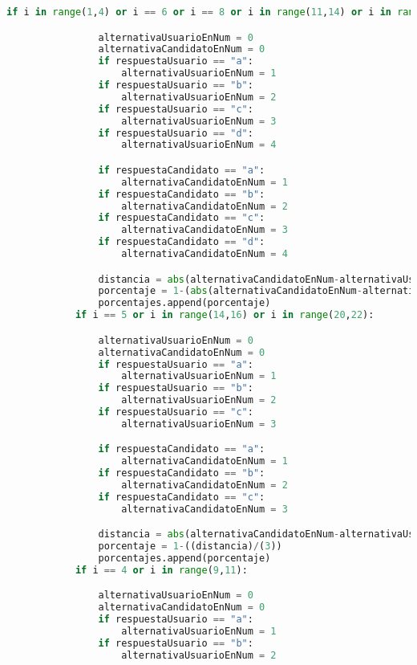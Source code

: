 \documentclass[a4paper]{article}
\begin{document}
\begin{lstlisting}[language=Python]
            if i in range(1,4) or i == 6 or i == 8 or i in range(11,14) or i in range(16,18) or i == 22: 

                alternativaUsuarioEnNum = 0
                alternativaCandidatoEnNum = 0
                if respuestaUsuario == "a":
                    alternativaUsuarioEnNum = 1
                if respuestaUsuario == "b":
                    alternativaUsuarioEnNum = 2
                if respuestaUsuario == "c":
                    alternativaUsuarioEnNum = 3
                if respuestaUsuario == "d":
                    alternativaUsuarioEnNum = 4

                if respuestaCandidato == "a":
                    alternativaCandidatoEnNum = 1
                if respuestaCandidato == "b":
                    alternativaCandidatoEnNum = 2
                if respuestaCandidato == "c":
                    alternativaCandidatoEnNum = 3
                if respuestaCandidato == "d":
                    alternativaCandidatoEnNum = 4

                distancia = abs(alternativaCandidatoEnNum-alternativaUsuarioEnNum)
                porcentaje = 1-(abs(alternativaCandidatoEnNum-alternativaUsuarioEnNum))/(4)
                porcentajes.append(porcentaje)
            if i == 5 or i in range(14,16) or i in range(20,22):

                alternativaUsuarioEnNum = 0
                alternativaCandidatoEnNum = 0
                if respuestaUsuario == "a":
                    alternativaUsuarioEnNum = 1
                if respuestaUsuario == "b":
                    alternativaUsuarioEnNum = 2
                if respuestaUsuario == "c":
                    alternativaUsuarioEnNum = 3

                if respuestaCandidato == "a":
                    alternativaCandidatoEnNum = 1
                if respuestaCandidato == "b":
                    alternativaCandidatoEnNum = 2
                if respuestaCandidato == "c":
                    alternativaCandidatoEnNum = 3

                distancia = abs(alternativaCandidatoEnNum-alternativaUsuarioEnNum)
                porcentaje = 1-((distancia)/(3))
                porcentajes.append(porcentaje)
            if i == 4 or i in range(9,11):

                alternativaUsuarioEnNum = 0
                alternativaCandidatoEnNum = 0
                if respuestaUsuario == "a":
                    alternativaUsuarioEnNum = 1
                if respuestaUsuario == "b":
                    alternativaUsuarioEnNum = 2


\end{lstlisting}
\end{document}
